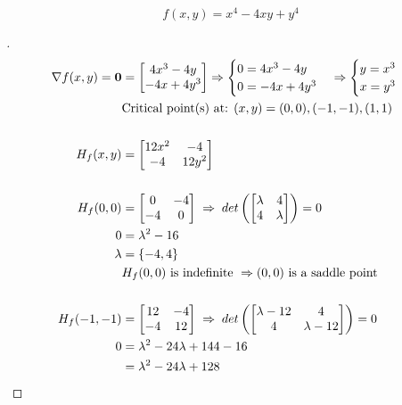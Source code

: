 \documentclass[12pt]{article}
\newenvironment{exercise}[2][Exercise]{\begin{trivlist}
\item[\hskip \labelsep {\bfseries #1}\hskip \labelsep {\bfseries #2.}]}{\end{trivlist}}
\begin{document}
\pagebreak
\begin{exercise}{2}
	\[ f(x,y) = x^4 - 4xy + y^4 \]
\end{exercise}
\begin{proof}[]
	\begin{align*}
		\nabla f(x,y) = \bm{0} &= \begin{bmatrix} 4x^3 - 4y \\ -4x + 4y^3 \end{bmatrix} \Rightarrow
		\begin{cases} 0 = 4x^3 - 4y \\ 0 = -4x + 4y^3 \end{cases} \Rightarrow
		\begin{cases} y = x^3 \\ x = y^3 \end{cases} \\
		& \textnormal{Critical point(s) at: } (x,y) = (0,0), (-1, -1), (1, 1) \\[15pt]
		H_f(x,y) &= \begin{bmatrix} 12x^2 & -4 \\ -4 & 12y^2 \end{bmatrix} \\[15pt]
		H_f(0,0) &= \begin{bmatrix} 0 & -4 \\ -4 & 0 \end{bmatrix} \; \Rightarrow \; det\left( \begin{bmatrix} \lambda & 4 \\ 4 & \lambda \end{bmatrix} \right) = 0 \\
		0 &= \lambda^2 - 16 \\
		\lambda &= \left\lbrace -4, 4 \right\rbrace \\
		& H_f(0,0) \textnormal{ is indefinite } \Rightarrow (0,0) \textnormal{ is a saddle point} \\[15pt]
		H_f(-1, -1) &= \begin{bmatrix} 12 & -4 \\ -4 & 12 \end{bmatrix} \; \Rightarrow \; det\left( \begin{bmatrix} \lambda - 12 & 4 \\ 4 & \lambda - 12 \end{bmatrix} \right) = 0 \\
		0 &= \lambda^2  - 24 \lambda + 144 - 16 \\
		 &= \lambda^2  - 24 \lambda + 128 \\

\end{align*}
\end{proof}
\end{document}
